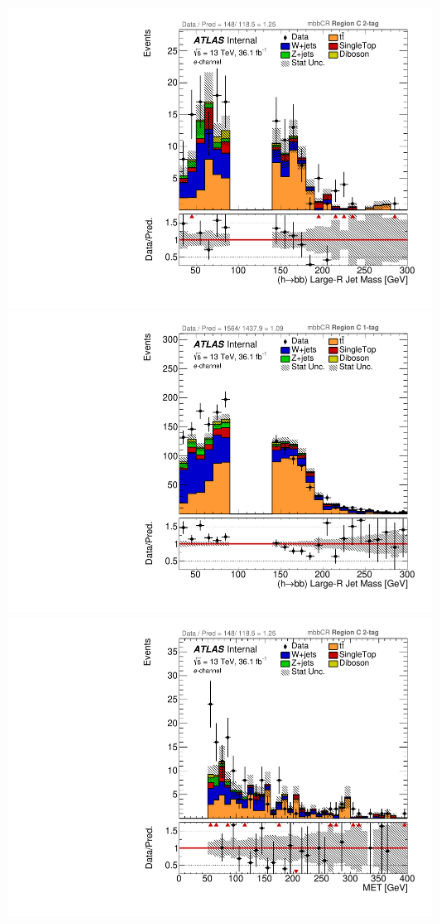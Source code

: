 \begin{figure}[!htbp]
\begin{center}
\includegraphics[scale=0.33]{./figures/boosted/ABCD_ScaledPrompt/elec_mbbcr_RegionC_HbbMass}
\includegraphics[scale=0.33]{./figures/boosted/ABCD_ScaledPrompt/elec_mbbcr_RegionC_1tag_HbbMass}\\
\includegraphics[scale=0.33]{./figures/boosted/ABCD_ScaledPrompt/elec_mbbcr_RegionC_MET}

\end{center}
\end{figure}
